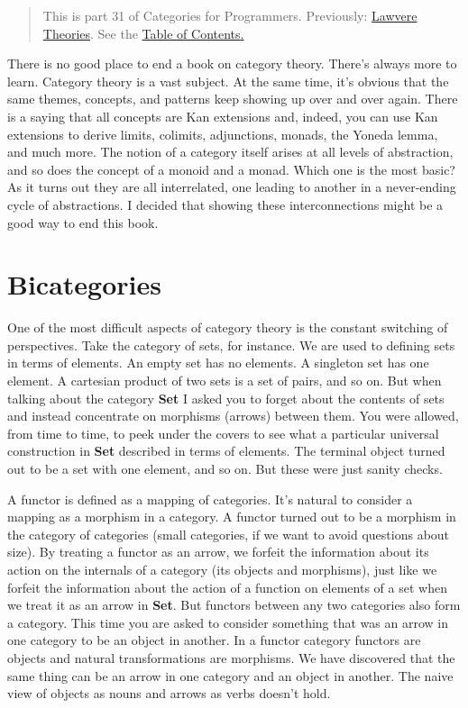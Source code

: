 \begin{quote}
This is part 31 of Categories for Programmers. Previously:
\href{https://bartoszmilewski.com/2017/08/26/lawvere-theories/}{Lawvere
Theories}. See the
\href{https://bartoszmilewski.com/2014/10/28/category-theory-for-programmers-the-preface/}{Table
of Contents}\href{https://bartoszmilewski.com/2017/07/22/topoi/}{.}
\end{quote}

There is no good place to end a book on category theory. There's always
more to learn. Category theory is a vast subject. At the same time, it's
obvious that the same themes, concepts, and patterns keep showing up
over and over again. There is a saying that all concepts are Kan
extensions and, indeed, you can use Kan extensions to derive limits,
colimits, adjunctions, monads, the Yoneda lemma, and much more. The
notion of a category itself arises at all levels of abstraction, and so
does the concept of a monoid and a monad. Which one is the most basic?
As it turns out they are all interrelated, one leading to another in a
never-ending cycle of abstractions. I decided that showing these
interconnections might be a good way to end this book.

\section{Bicategories}\label{bicategories}

One of the most difficult aspects of category theory is the constant
switching of perspectives. Take the category of sets, for instance. We
are used to defining sets in terms of elements. An empty set has no
elements. A singleton set has one element. A cartesian product of two
sets is a set of pairs, and so on. But when talking about the category
\textbf{Set} I asked you to forget about the contents of sets and
instead concentrate on morphisms (arrows) between them. You were
allowed, from time to time, to peek under the covers to see what a
particular universal construction in \textbf{Set} described in terms of
elements. The terminal object turned out to be a set with one element,
and so on. But these were just sanity checks.

A functor is defined as a mapping of categories. It's natural to
consider a mapping as a morphism in a category. A functor turned out to
be a morphism in the category of categories (small categories, if we
want to avoid questions about size). By treating a functor as an arrow,
we forfeit the information about its action on the internals of a
category (its objects and morphisms), just like we forfeit the
information about the action of a function on elements of a set when we
treat it as an arrow in \textbf{Set}. But functors between any two
categories also form a category. This time you are asked to consider
something that was an arrow in one category to be an object in another.
In a functor category functors are objects and natural transformations
are morphisms. We have discovered that the same thing can be an arrow in
one category and an object in another. The naive view of objects as
nouns and arrows as verbs doesn't hold.

